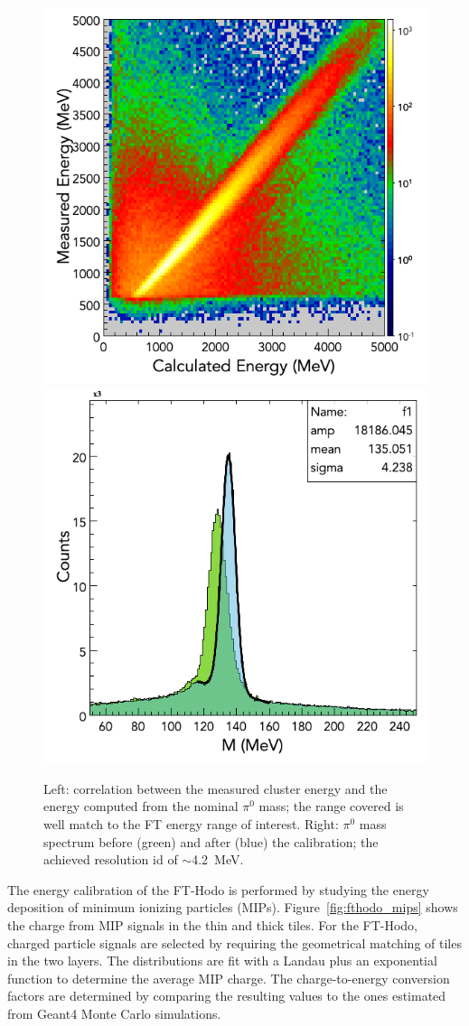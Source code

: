 \begin{figure}
\includegraphics[height=0.48\columnwidth]{fig/ftcal_pi0linearity.png}
\includegraphics[height=0.48\columnwidth]{fig/ftcal_pi0resolution.png}
\caption{Left: correlation between the measured cluster energy and the energy computed from the nominal $\pi^0$
  mass; the range covered is well match to the FT energy range of interest. Right: $\pi^0$ mass spectrum before
  (green) and after (blue) the calibration; the achieved resolution id of $\sim$4.2~MeV.}
\label{fig:ftcal_pi0res}
\end{figure}

The energy calibration of the FT-Hodo is performed by studying the energy deposition of minimum ionizing particles
(MIPs). Figure~\ref{fig:fthodo_mips} shows the charge from MIP signals in the thin and thick tiles. For the FT-Hodo,
charged particle signals are selected by requiring the geometrical matching of tiles in the two layers. The
distributions are fit with a Landau plus an exponential function to determine the average MIP charge. The
charge-to-energy conversion factors are determined by comparing the resulting values to the ones estimated from
Geant4 Monte Carlo simulations.

